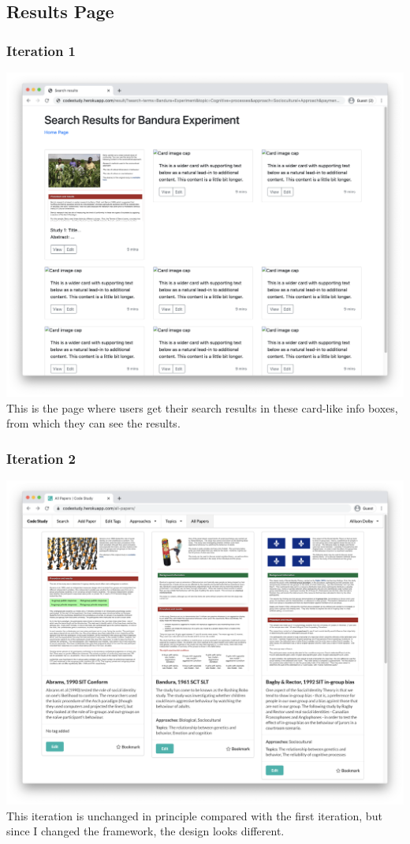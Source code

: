 \documentclass[
]{article}
\begin{document}
\hypertarget{results-page}{%
\subsection{Results Page}\label{results-page}}

\hypertarget{iteration-1-2}{%
\subsubsection{Iteration 1}\label{iteration-1-2}}

\includegraphics{img/results page iteration 1.png}\\
This is the page where users get their search results in these card-like
info boxes, from which they can see the results.

\hypertarget{iteration-2-2}{%
\subsubsection{Iteration 2}\label{iteration-2-2}}

\includegraphics{img/results page iteration 2.png}\\
This iteration is unchanged in principle compared with the first
iteration, but since I changed the framework, the design looks
different.
\end{document}
